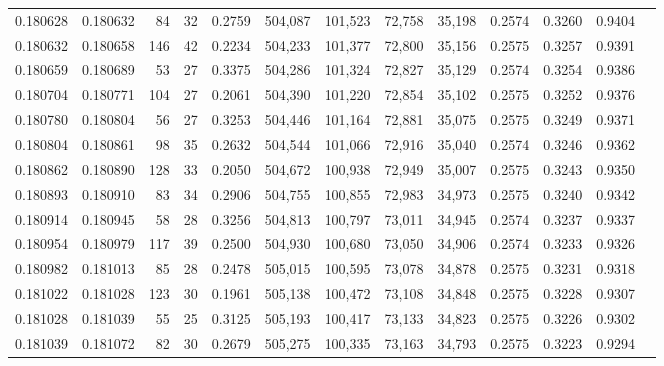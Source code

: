 \begin{tabular}{rrrrrrrrrrrrr}
0.180628 & 0.180632 &    84 &  32 &                                     0.2759 & 504,087 & 101,523 &  72,758 &  35,198 & 0.2574 & 0.3260 & 0.9404 \\
0.180632 & 0.180658 &   146 &  42 &                                     0.2234 & 504,233 & 101,377 &  72,800 &  35,156 & 0.2575 & 0.3257 & 0.9391 \\
0.180659 & 0.180689 &    53 &  27 &                                     0.3375 & 504,286 & 101,324 &  72,827 &  35,129 & 0.2574 & 0.3254 & 0.9386 \\
0.180704 & 0.180771 &   104 &  27 &                                     0.2061 & 504,390 & 101,220 &  72,854 &  35,102 & 0.2575 & 0.3252 & 0.9376 \\
0.180780 & 0.180804 &    56 &  27 &                                     0.3253 & 504,446 & 101,164 &  72,881 &  35,075 & 0.2575 & 0.3249 & 0.9371 \\
0.180804 & 0.180861 &    98 &  35 &                                     0.2632 & 504,544 & 101,066 &  72,916 &  35,040 & 0.2574 & 0.3246 & 0.9362 \\
0.180862 & 0.180890 &   128 &  33 &                                     0.2050 & 504,672 & 100,938 &  72,949 &  35,007 & 0.2575 & 0.3243 & 0.9350 \\
0.180893 & 0.180910 &    83 &  34 &                                     0.2906 & 504,755 & 100,855 &  72,983 &  34,973 & 0.2575 & 0.3240 & 0.9342 \\
0.180914 & 0.180945 &    58 &  28 &                                     0.3256 & 504,813 & 100,797 &  73,011 &  34,945 & 0.2574 & 0.3237 & 0.9337 \\
0.180954 & 0.180979 &   117 &  39 &                                     0.2500 & 504,930 & 100,680 &  73,050 &  34,906 & 0.2574 & 0.3233 & 0.9326 \\
0.180982 & 0.181013 &    85 &  28 &                                     0.2478 & 505,015 & 100,595 &  73,078 &  34,878 & 0.2575 & 0.3231 & 0.9318 \\
0.181022 & 0.181028 &   123 &  30 &                                     0.1961 & 505,138 & 100,472 &  73,108 &  34,848 & 0.2575 & 0.3228 & 0.9307 \\
0.181028 & 0.181039 &    55 &  25 &                                     0.3125 & 505,193 & 100,417 &  73,133 &  34,823 & 0.2575 & 0.3226 & 0.9302 \\
0.181039 & 0.181072 &    82 &  30 &                                     0.2679 & 505,275 & 100,335 &  73,163 &  34,793 & 0.2575 & 0.3223 & 0.9294 \\

\end{tabular}
